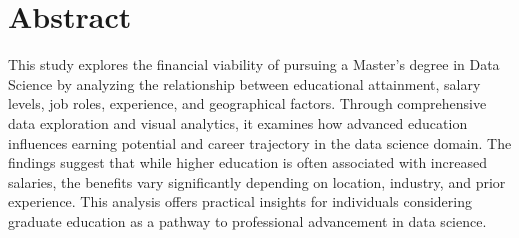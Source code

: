 \thispagestyle{plain} %



\chapter*{Abstract} %
This study explores the financial viability of pursuing a Master's degree in Data Science by analyzing the relationship between educational attainment, salary levels, job roles, experience, and geographical factors. Through comprehensive data exploration and visual analytics, it examines how advanced education influences earning potential and career trajectory in the data science domain. The findings suggest that while higher education is often associated with increased salaries, the benefits vary significantly depending on location, industry, and prior experience. This analysis offers practical insights for individuals considering graduate education as a pathway to professional advancement in data science.
\blankpage


